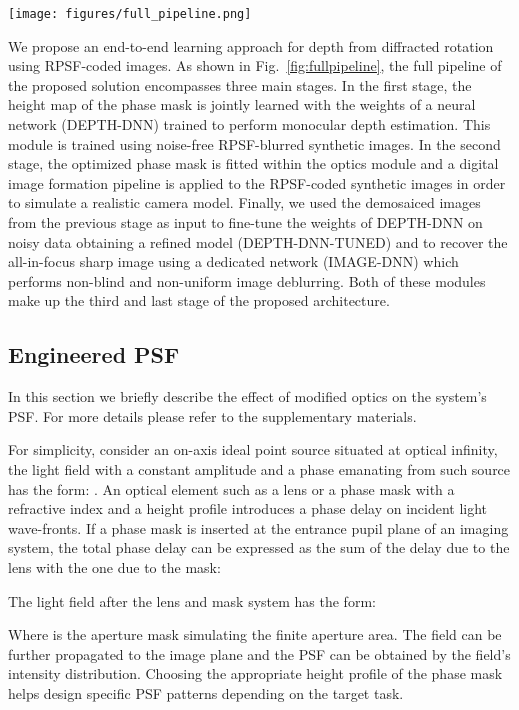 \documentclass[preprint,5p,twocolumn]{elsarticle}
\begin{document}
\begin{figure*}[h!]
\begin{center}
\texttt{[image: figures/full\_pipeline.png]}
\end{center}
   \caption{The full architecture of our end-to-end learning framework.}
\label{fig:fullpipeline}
\end{figure*}


We propose an end-to-end learning approach for depth from diffracted rotation using RPSF-coded images. As shown in Fig.~\ref{fig:fullpipeline}, the full pipeline of the proposed solution encompasses three main stages. In the first stage, the height map of the phase mask is jointly learned  with the weights of a neural network (DEPTH-DNN) trained to perform monocular depth estimation. This module is trained using noise-free RPSF-blurred synthetic images. In the second stage, the optimized phase mask is fitted within the optics module and a digital image formation pipeline is applied to the RPSF-coded synthetic images in order to simulate a realistic camera model. Finally, we used the demosaiced images from the previous stage as input to fine-tune the weights of DEPTH-DNN on noisy data obtaining a refined model (DEPTH-DNN-TUNED) and to recover the all-in-focus sharp image using a dedicated network (IMAGE-DNN) which performs non-blind and non-uniform image deblurring. Both of these modules make up the third and last stage of the proposed architecture. 

\subsection{Engineered PSF}
In this section we briefly describe the effect of modified optics on the system's PSF. For more details please refer to the supplementary materials. 

For simplicity, consider an on-axis ideal point source situated at optical infinity, the light field  with a constant amplitude  and a phase  emanating from such source has the form:
.
An optical element such as a lens or a phase mask with a refractive index  and a height profile  introduces a phase delay  on incident light wave-fronts. If a phase mask is inserted at the entrance pupil plane of an imaging system, the total phase delay can be expressed as the sum of the delay due to the lens with the one due to the mask: 


The  light field after the lens and mask system has the form:

Where  is the aperture mask simulating the finite aperture area. The field  can be further propagated to the image plane and the PSF can be obtained by the field's intensity distribution. 
Choosing the appropriate height profile of the phase mask helps design specific PSF patterns depending on the target task.
\end{document}
